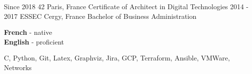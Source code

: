 \documentclass[10pt]{developercv} %
\begin{document}

\begin{entrylist}
	\entry
		{Since 2018}
		{42}
		{Paris, France}
		{Certificate of Architect in Digital Technologies}
	\entry
		{2014 - 2017}
		{ESSEC}
		{Cergy, France}
		{Bachelor of Business Administration}
\end{entrylist}


\begin{minipage}[t]{0.5\textwidth}
	\vspace{-\baselineskip} %


	\textbf{French} - native\\
	\textbf{English} - proficient
\end{minipage}
\hfill
\begin{minipage}[t]{0.5\textwidth}
	\vspace{-\baselineskip} %


	{C, Python, Git, Latex, Graphviz, Jira, GCP, Terraform, Ansible, VMWare, Networks}

\end{minipage}

\end{document}
